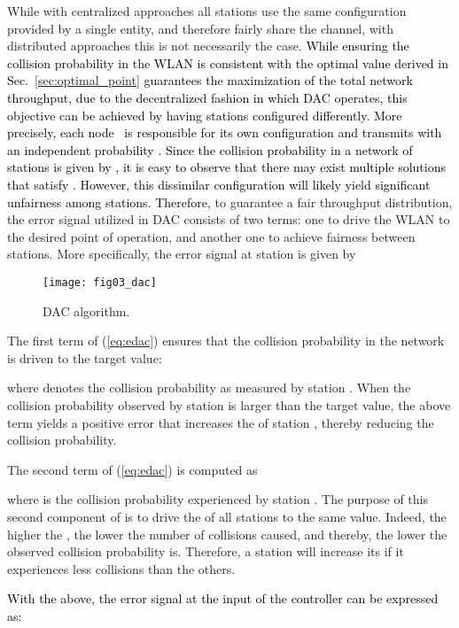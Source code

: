 \documentclass[a4paper,10pt]{article}
\newcommand{\revs}[1]{\textcolor{black}{#1}}
\begin{document}
While with centralized approaches all stations use the same configuration provided by a single entity, and therefore fairly share the channel, with distributed approaches this is not necessarily the case. \revs{While ensuring the collision probability in the WLAN is consistent with the optimal value derived in Sec.~\ref{sec:optimal_point} guarantees the maximization of the total network throughput, due to the decentralized fashion in which DAC operates, this objective can be achieved by having stations configured differently. More precisely, each node~ is responsible for its own configuration and transmits with an independent probability . Since the collision probability in a network of  stations is given by , it is easy to observe that there may exist multiple  solutions that satisfy . However, this dissimilar  configuration will likely yield significant unfairness among stations. Therefore,} to guarantee a fair throughput distribution, the error signal utilized in DAC consists of two terms: one to drive the WLAN to the desired point of operation, and another one to achieve fairness between stations. More specifically, the error signal at station  is given by


\begin{figure}\texttt{[image: fig03\_dac]}\caption{DAC algorithm.}\label{fig:dac}\end{figure}

The first term of (\ref{eq:edac}) ensures that the collision probability in the network is driven to the target value:

where  denotes the collision probability as measured by station . When the collision probability observed by station  is larger than the target value, the above term yields a positive error that increases the  of station , thereby reducing the collision probability.

The second term of (\ref{eq:edac}) is computed as

where  is the collision probability experienced by station . The purpose of this second component of  is to drive the  of all stations to the same value. Indeed, the higher the , the lower the number of collisions caused, and thereby, the lower the observed collision probability  is. Therefore, a station will increase its  if it experiences less collisions than the others.

\revs{
With the above, the error signal at the input of the controller can be expressed as:

}
\end{document}
